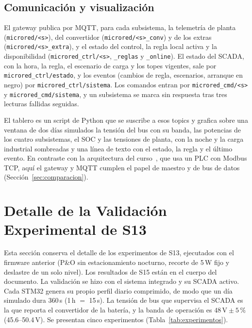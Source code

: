 \documentclass[conference]{IEEEtran}
\begin{document}
\subsection{Comunicación y visualización}

El gateway publica por MQTT, para cada subsistema, la telemetría de planta (\texttt{microred/<s>}), del convertidor (\texttt{microred/<s>\_conv}) y de los extras (\texttt{microred/<s>\_extra}), y el estado del control, la regla local activa y la disponibilidad (\texttt{microred\_ctrl/<s>}, \texttt{\_reglas} y \texttt{\_online}). El estado del SCADA, con la hora, la regla, el escenario de carga y los topes vigentes, sale por \texttt{microred\_ctrl/estado}, y los eventos (cambios de regla, escenarios, arranque en negro) por \texttt{microred\_ctrl/sistema}. Los comandos entran por \texttt{microred\_cmd/<s>} y \texttt{microred\_cmd/sistema}, y un subsistema se marca sin respuesta tras tres lecturas fallidas seguidas.

El tablero es un script de Python que se suscribe a esos topics y grafica sobre una ventana de dos días simulados la tensión del bus con su banda, las potencias de los cuatro subsistemas, el SOC y las tensiones de planta, con la noche y la carga industrial sombreadas y una línea de texto con el estado, la regla y el último evento. En contraste con la arquitectura del curso~\cite{alvarez2026scada}, que usa un PLC con Modbus TCP, aquí el gateway y MQTT cumplen el papel de maestro y de bus de datos (Sección~\ref{sec:comparacion}).

\section{Detalle de la Validación Experimental de S13}
\label{sec:validacion}\label{app:s13}

Esta sección conserva el detalle de los experimentos de S13, ejecutados con el firmware anterior (P\&O sin estacionamiento nocturno, recorte de 5\,W fijo y deslastre de un solo nivel). Los resultados de S15 están en el cuerpo del documento. La validación se hizo con el sistema integrado y su SCADA activo. Cada STM32 genera su propio perfil diario comprimido, de modo que un día simulado dura 360\,s (1\,h $=$ 15\,s). La tensión de bus que supervisa el SCADA es la que reporta el convertidor de la batería, y la banda de operación es $48\,\text{V}\pm5\,\%$ (45.6--50.4\,V). Se presentan cinco experimentos (Tabla~\ref{tab:experimentos}).
\end{document}
